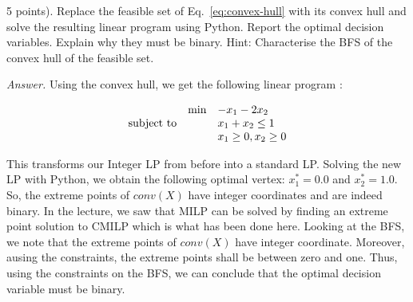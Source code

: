 \documentclass[10pt]{article}
\newenvironment{exercise}[2][Exercise]{\begin{trivlist}
  \item[\hskip \labelsep {\bfseries #1}\hskip \labelsep {\bfseries #2.}]}{\end{trivlist}}
\begin{document}
\begin{exercise}{4}
(5 points). Replace the feasible set of Eq.~\ref{eq:convex-hull} with its convex hull and solve the resulting linear program using Python. Report the optimal decision variables. Explain why they must be binary. Hint:
Characterise the BFS of the convex hull of the feasible set.


\textit{Answer.}
Using the convex hull, we get the following linear program : 

\begin{equation*}
\begin{array}{lll@{}lll}
&\text{min}  & - x_1 - 2 x_2  &\\
\text{subject to} 
&& x_1 + x_2 \leq 1 \\
&&  x_1  \geq 0,  x_2 \geq 0 \\
          
\end{array}
\end{equation*}

This transforms our Integer LP from before into a standard LP. Solving the new LP with Python, we obtain  the following optimal vertex: $x_1^*=  0.0$ and $x_2^* = 1.0$. So, the extreme points of $conv(X)$ have integer coordinates and are indeed binary. In the lecture, we saw that MILP can be solved by finding an extreme point solution to CMILP which is what has been done here. Looking at the BFS,  we note that the extreme points of $conv(X)$ have integer coordinate. 
Moreover, ausing the constraints, the extreme points shall be between zero and one. 
Thus, using the constraints on the BFS, we can conclude that the optimal decision variable  must be binary. 


\end{exercise}
  
  
\end{document}
